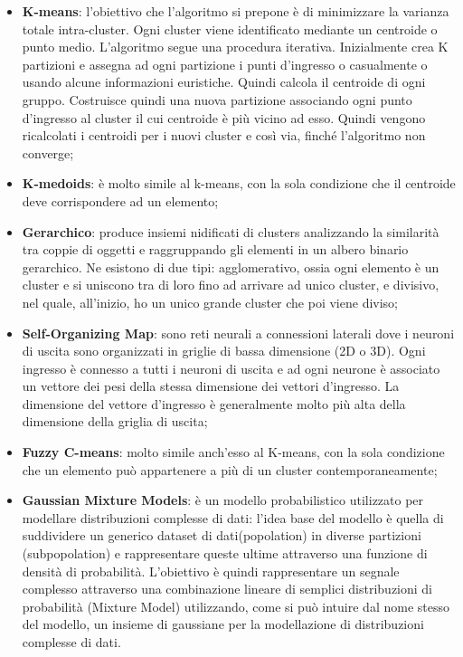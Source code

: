 \begin{itemize}
	\item \textbf{K-means}: l'obiettivo che l'algoritmo si prepone è di minimizzare la varianza totale intra-cluster. Ogni cluster viene identificato mediante un centroide o punto medio. L'algoritmo segue una procedura iterativa. Inizialmente crea K partizioni e assegna ad ogni partizione i punti d'ingresso o casualmente o usando alcune informazioni euristiche. Quindi calcola il centroide di ogni gruppo. Costruisce quindi una nuova partizione associando ogni punto d'ingresso al cluster il cui centroide è più vicino ad esso. Quindi vengono ricalcolati i centroidi per i nuovi cluster e così via, finché l'algoritmo non converge;
	\item \textbf{K-medoids}: è molto simile al k-means, con la sola condizione che il centroide deve corrispondere ad un elemento;
	\item \textbf{Gerarchico}: produce insiemi nidificati di clusters analizzando la similarità tra coppie di oggetti e raggruppando gli elementi in un albero binario gerarchico. Ne esistono di due tipi: agglomerativo, ossia ogni elemento è un cluster e si uniscono tra di loro fino ad arrivare ad unico cluster, e divisivo, nel quale, all'inizio, ho un unico grande cluster che poi viene diviso;
	\item \textbf{Self-Organizing Map}: sono reti neurali a connessioni laterali dove i neuroni di uscita sono organizzati in griglie di bassa dimensione (2D o 3D). Ogni ingresso è connesso a tutti i neuroni di uscita e ad ogni neurone è associato un vettore dei pesi della stessa dimensione dei vettori d'ingresso. La dimensione del vettore d'ingresso è generalmente molto più alta della dimensione della griglia di uscita;
	\item \textbf{Fuzzy C-means}: molto simile anch'esso al K-means, con la sola condizione che un elemento può appartenere a più di un cluster contemporaneamente;
	\item \textbf{Gaussian Mixture Models}: è un modello probabilistico utilizzato per modellare distribuzioni complesse di dati: l’idea base del modello è quella di suddividere un generico dataset di dati(popolation) in diverse partizioni (subpopolation) e rappresentare queste ultime attraverso una funzione di densità di probabilità. L’obiettivo è quindi rappresentare un segnale complesso attraverso una combinazione lineare di semplici distribuzioni di probabilità (Mixture Model) utilizzando, come si può intuire dal nome stesso del modello, un insieme di gaussiane per la modellazione di distribuzioni complesse di dati.
\end{itemize}
